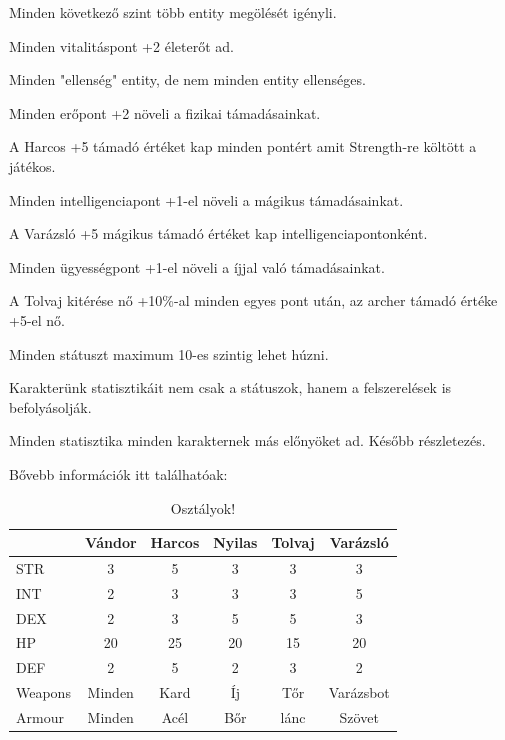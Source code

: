 \noindent Minden következő szint több entity megölését igényli.

\noindent Minden vitalitáspont +2 életerőt ad.

\noindent Minden "ellenség" entity, de nem minden entity ellenséges.


\noindent Minden erőpont +2 növeli a fizikai támadásainkat.

\noindent A Harcos +5 támadó értéket kap minden pontért amit Strength-re költött a játékos.

\noindent Minden intelligenciapont +1-el növeli a mágikus támadásainkat.

\noindent A Varázsló +5 mágikus támadó értéket kap intelligenciapontonként.

\noindent Minden ügyességpont +1-el növeli a íjjal való támadásainkat.

\noindent A Tolvaj kitérése nő +10\%-al minden egyes pont után, az archer támadó értéke +5-el nő.

\noindent Minden státuszt maximum 10-es szintig lehet húzni.


Karakterünk statisztikáit nem csak a státuszok, hanem a felszerelések is befolyásolják.

Minden statisztika minden karakternek más előnyöket ad. Később részletezés. 

Bővebb információk itt találhatóak:%
\begin{table}[!ht]
\centering
\caption{Osztályok!}
\label{tab:table1}
\begin{tabular}{|l|c|c|c|c|c|}
\hline
 & Vándor & Harcos & Nyilas & Tolvaj & Varázsló \\
\hline
STR & 3 & 5 & 3 & 3 & 3 \\
\hline
INT & 2 & 3 & 3 & 3 & 5 \\
\hline
DEX & 2 & 3 & 5 & 5 & 3 \\
\hline
HP & 20 & 25 & 20 & 15 & 20 \\
\hline
DEF & 2 & 5 & 2 & 3 & 2 \\
\hline
Weapons & Minden & Kard & Íj & Tőr & Varázsbot \\
\hline
Armour & Minden & Acél & Bőr & lánc & Szövet \\
\hline
\end{tabular}
\end{table}

